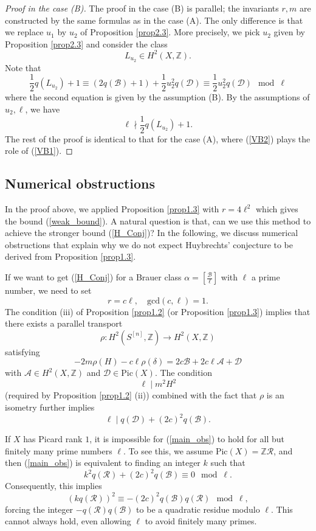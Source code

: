 \documentclass[11pt]{amsart}
\theoremstyle{plain}
\theoremstyle{definition}
\theoremstyle{remark}
\newcommand{\BZ}{{\mathbb{Z}}}
\newcommand{\CA}{{\mathcal A}}
\newcommand{\CB}{{\mathcal B}}
\newcommand{\CD}{{\mathcal D}}
\newcommand{\CR}{{\mathcal R}}
\begin{document}
\begin{proof}[Proof in the case (B)] The proof in the case (B) is parallel; the invariants $r,m$ are constructed by the same formulas as in the case (A). The only difference is that we replace $u_1$ by $u_2$ of Proposition \ref{prop2.3}. More precisely, we pick $u_2$ given by Proposition \ref{prop2.3} and consider the class
\[
L_{u_2} \in H^2(X, \BZ).
\]
Note that
\[
\frac{1}{2}q(L_{u_2}) +1 \equiv (2q(\CB) +1) +\frac{1}{2} u_2^2q(\CD) \equiv \frac{1}{2} u_2^2q(\CD) \mod \ell
\]
where the second equation is given by the assumption (B). By the assumptions of $u_2,\ell$, we have 
\begin{equation}\label{VB2}
    \ell \nmid \frac{1}{2}q(L_{u_2}) +1.
\end{equation}
The rest of the proof is identical to that for the case (A), where (\ref{VB2}) plays the role of (\ref{VB1}).
\end{proof}



\subsection{Numerical obstructions}\label{NumOb}
In the proof above, we applied Proposition \ref{prop1.3} with $r =  4\ell^2$ which gives the bound (\ref{weak_bound}). A natural question is that, can we use this method to achieve the stronger bound (\ref{H_Conj})?
In the following, we discuss numerical obstructions that explain why we do not expect Huybrechts' conjecture to be derived from Proposition \ref{prop1.3}.

If we want to get (\ref{H_Conj}) for a Brauer class $\alpha = \left[\frac{\CB}{\ell} \right]$ with $\ell$ a prime number, we need to set 
\[
r =  c\ell, \quad \mathrm{gcd}(c,\ell)=1.
\]
The condition (iii) of Proposition \ref{prop1.2} (or Proposition \ref{prop1.3}) implies that there exists a parallel transport
\[
\rho: H^2(S^{[n]}, \BZ) \to H^2(X,\BZ)
\]
satisfying 
\[
-2m \rho(H) -c\ell \rho(\delta) = 2c \CB +2c\ell \CA +\CD
\]
with $\CA \in H^2(X,\BZ)$ and $\CD\in \mathrm{Pic}(X)$. The condition 
\[
\ell \mid m^2H^2
\]
(required by Proposition \ref{prop1.2} (ii)) combined with the fact that $\rho$ is an isometry further implies
\begin{equation}\label{main_obs}
\ell \mid q(\CD) + (2c)^2q(\CB).
\end{equation}

If $X$ has Picard rank $1$, it is impossible for (\ref{main_obs}) to hold for all but finitely many prime numbers $\ell$. To see this, we assume $\mathrm{Pic}(X) = \BZ \CR$, and then (\ref{main_obs}) is equivalent to finding an integer $k$ such that
\[
k^2 q(\CR) + (2c)^2 q(\CB) \equiv 0 \mod \ell.
\]
Consequently, this implies
\[
\left( kq(\CR) \right)^2 \equiv -(2c)^2q(\CB)q(\CR) \mod \ell,
\]
forcing the integer $-q(\CR)q(\CB)$ to be a quadratic residue modulo $\ell$. This cannot always hold, even allowing $\ell$ to avoid finitely many primes.
\end{document}
